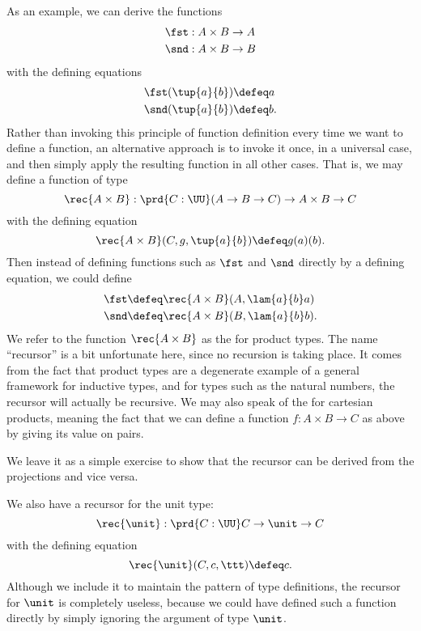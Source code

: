 As an example, we can derive the 
%
%
%
functions
%
\begin{align*}
  \fst & :  A \times B \to A \\
  \snd & :  A \times B \to B
\end{align*}
with the defining equations 
\begin{align*}
  \fst(\tup{a}{b}) & \defeq  a \\
  \snd(\tup{a}{b}) & \defeq  b.
\end{align*}
%
%
Rather than invoking this principle of function definition every time we want to define a function, an alternative approach is to invoke it once, in a universal case, and then simply apply the resulting function in all other cases.
That is, we may define a function of type
\begin{equation}
  \rec{A\times B} : \prd{C:\UU}(A \to B \to C) \to A \times B \to C
\end{equation}
with the defining equation
\[\rec{A\times B}(C,g,\tup{a}{b}) \defeq g(a)(b). \]
Then instead of defining functions such as $\fst$ and $\snd$ directly by a defining equation, we could  define
\begin{align*}
  \fst &\defeq \rec{A\times B}(A, \lam{a}{b} a)\\
  \snd &\defeq \rec{A\times B}(B, \lam{a}{b} b).
\end{align*}
We refer to the function $\rec{A\times B}$ as the 
%
for product types.  The name ``recursor'' is a bit unfortunate here, since no recursion is taking place.  It comes from the fact that product types are a degenerate example of a general framework for inductive types, and for types such as the natural numbers, the recursor will actually be recursive.  We may also speak of the  for cartesian products, meaning the fact that we can define a function $f:A\times B\to C$ as above by giving its value on pairs.
%

We leave it as a simple exercise to show that the recursor can be
derived from the projections and vice versa.

%
We also have a recursor for the unit type:
\[\rec{\unit} : \prd{C:\UU}C \to \unit \to C\]
with the defining equation
\[ \rec{\unit}(C,c,\ttt) \defeq c. \]
Although we include it to maintain the pattern of type definitions, the recursor for $\unit$ is completely useless,
because we could have defined such a function directly
by simply ignoring the argument of type $\unit$.

